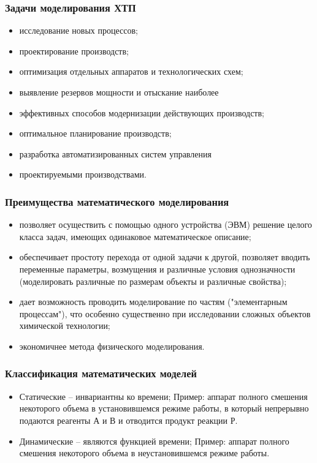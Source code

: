 \begin{frame}
	\frametitle{Задачи моделирования ХТП}
	\begin{itemize}
		\item исследование новых процессов;
		\item проектирование производств;
		\item оптимизация отдельных аппаратов и технологических схем;
		\item выявление резервов мощности и отыскание наиболее
		\item эффективных способов модернизации действующих
		производств; 
		\item оптимальное планирование производств; 
		\item 	разработка автоматизированных систем управления
		\item проектируемыми производствами.
	\end{itemize}
	
\end{frame}

\begin{frame}
	\frametitle{Преимущества математического моделирования}
	\begin{itemize}
		\item позволяет осуществить с помощью одного устройства (ЭВМ) решение целого класса задач, имеющих одинаковое математическое описание;
		\item обеспечивает простоту перехода от одной задачи к другой, позволяет вводить переменные параметры, возмущения и различные условия однозначности (моделировать различные по размерам объекты и различные свойства);
		\item дает возможность проводить моделирование по частям ("элементарным процессам"), что особенно существенно при исследовании сложных объектов химической технологии;
		\item экономичнее метода физического моделирования.
	\end{itemize}
	
\end{frame}

\begin{frame}
	\frametitle{Классификация математических моделей}
	\begin{itemize}
		\item Статические – инвариантны ко времени; Пример: аппарат полного смешения некоторого объема в установившемся режиме работы, в который непрерывно подаются реагенты А и В и отводится продукт реакции Р.
		\item Динамические – являются функцией времени; Пример: аппарат полного смешения некоторого объема в неустановившемся режиме работы.
	\end{itemize}
\end{frame}

